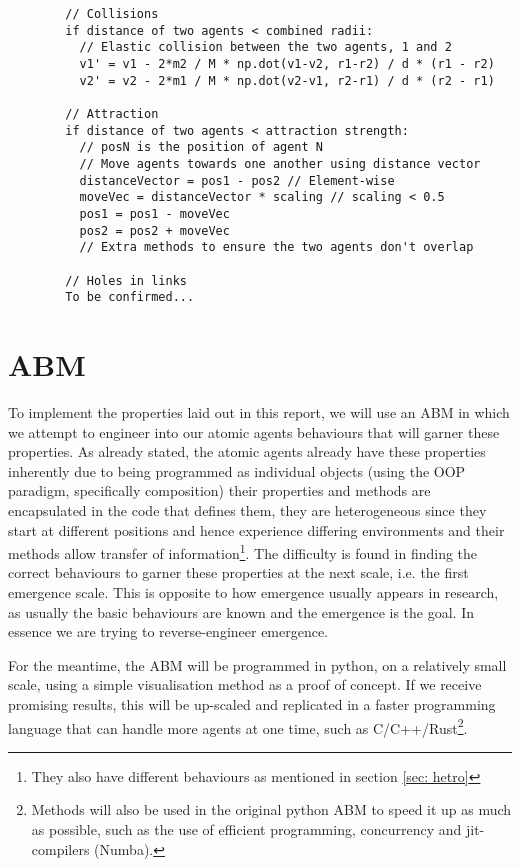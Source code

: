 \documentclass{article}
\begin{document}
      \begin{verbatim}
        // Collisions
        if distance of two agents < combined radii:
          // Elastic collision between the two agents, 1 and 2
          v1' = v1 - 2*m2 / M * np.dot(v1-v2, r1-r2) / d * (r1 - r2) 
          v2' = v2 - 2*m1 / M * np.dot(v2-v1, r2-r1) / d * (r2 - r1)

        // Attraction
        if distance of two agents < attraction strength:
          // posN is the position of agent N
          // Move agents towards one another using distance vector 
          distanceVector = pos1 - pos2 // Element-wise 
          moveVec = distanceVector * scaling // scaling < 0.5
          pos1 = pos1 - moveVec
          pos2 = pos2 + moveVec
          // Extra methods to ensure the two agents don't overlap

        // Holes in links
        To be confirmed...
      \end{verbatim}


\section{ABM}

To implement the properties laid out in this report, we will use an ABM in which we attempt to engineer into our atomic agents behaviours that will garner these properties. As already stated, the atomic agents already have these properties inherently due to being programmed as individual objects (using the OOP paradigm, specifically composition) their properties and methods are encapsulated in the code that defines them, they are heterogeneous since they start at different positions and hence experience differing environments and their methods allow transfer of information\footnote{They also have different behaviours as mentioned in section \ref{sec: hetro}}. The difficulty is found in finding the correct behaviours to garner these properties at the next scale, i.e. the first emergence scale. This is opposite to how emergence usually appears in research, as usually the basic behaviours are known and the emergence is the goal. In essence we are trying to reverse-engineer emergence.

  For the meantime, the ABM will be programmed in python, on a relatively small scale, using a simple visualisation method as a proof of concept. If we receive promising results, this will be up-scaled and replicated in a faster programming language that can handle more agents at one time, such as C/C++/Rust\footnote{Methods will also be used in the original python ABM to speed it up as much as possible, such as the use of efficient programming, concurrency and jit-compilers (Numba).}. 
\end{document}
